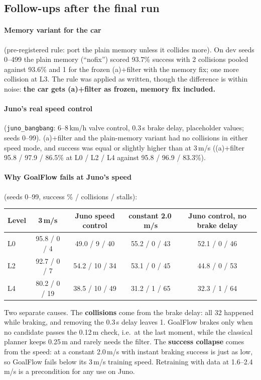 \documentclass[11pt,a4paper]{article}
\newcommand{\code}[1]{\texttt{#1}}
\begin{document}
\subsection{Follow-ups after the final run}
\paragraph{Memory variant for the car} (pre-registered rule: port the plain memory unless it collides more). On dev
seeds 0--499 the plain memory (``nofix'') scored 93.7\% success with 2 collisions pooled against 93.6\% and 1 for the
frozen (a)+filter with the memory fix; one more collision at L3. The rule was applied as written, though the
difference is within noise: \textbf{the car gets (a)+filter as frozen, memory fix included.}

\paragraph{Juno's real speed control} (\code{juno\_bangbang}: 6--8\,km/h valve control, 0.3\,s brake delay, placeholder
values; seeds 0--99). (a)+filter and the plain-memory variant had no collisions in either speed mode, and success was
equal or slightly higher than at 3\,m/s ((a)+filter 95.8 / 97.9 / 86.5\% at L0 / L2 / L4 against 95.8 / 96.9 / 83.3\%).

\paragraph{Why GoalFlow fails at Juno's speed} (seeds 0--99, success \% / collisions / stalls):
\begin{table}[H]
\small
\begin{tabular}{@{}lcccc@{}}
\toprule
Level & 3\,m/s & Juno speed control & constant 2.0\,m/s & Juno control, no brake delay \\
\midrule
L0 & 95.8 / 0 / 4 & 49.0 / 9 / 40 & 55.2 / 0 / 43 & 52.1 / 0 / 46 \\
L2 & 92.7 / 0 / 7 & 54.2 / 10 / 34 & 53.1 / 0 / 45 & 44.8 / 0 / 53 \\
L4 & 80.2 / 0 / 19 & 38.5 / 10 / 49 & 31.2 / 1 / 65 & 32.3 / 1 / 64 \\
\bottomrule
\end{tabular}
\end{table}
Two separate causes. The \textbf{collisions} come from the brake delay: all 32 happened while braking, and removing the
0.3\,s delay leaves 1. GoalFlow brakes only when no candidate passes the 0.12\,m check, i.e.\ at the last moment, while
the classical planner keeps 0.25\,m and rarely needs the filter. The \textbf{success collapse} comes from the speed: at a
constant 2.0\,m/s with instant braking success is just as low, so GoalFlow fails below its 3\,m/s training speed.
Retraining with data at 1.6--2.4\,m/s is a precondition for any use on Juno.
\end{document}
